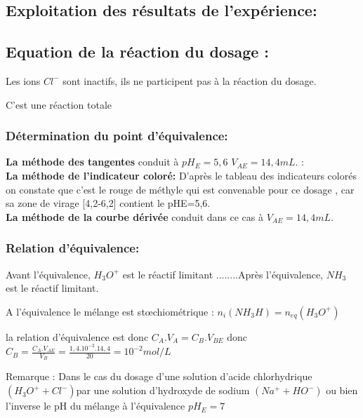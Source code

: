 \documentclass[12pt]{article}
\begin{document}
\subsection{Exploitation des résultats de l'expérience:}
\subsection{Equation de la réaction du dosage :}
Les ions $Cl^-$ sont inactifs, ils ne participent pas à la réaction du dosage. 


C'est une réaction totale


\subsubsection{Détermination du point d'équivalence:}
\textbf{La méthode des tangentes  }conduit à $pH_E = 5,6$ $V_{AE}=14,4mL$.
:
\\\textbf{La méthode de l'indicateur coloré:} D'après le tableau des indicateurs colorés on constate que c'est le rouge de méthyle
qui est convenable pour ce dosage , car sa zone de virage [4,2-6,2] contient le pHE=5,6.
\\\textbf{La méthode de la courbe dérivée }conduit dans ce cas à $V_{AE}=14,4mL$.


\subsubsection{Relation d'équivalence: }

Avant l'équivalence, $H_3O^+$ est le réactif limitant ........Après l'équivalence, $NH_3$ est le réactif limitant.

A l'équivalence le mélange est stœchiométrique : $n_i(NH_3H) = n_{eq}(H_3O^+)$

la relation d’équivalence est donc $C_A.V_A  = C_B.V_{BE}$
donc $C_B = \frac{C_A.V_{AE}}{V_B} = \frac{1,4.10^{-2}.14,4}{20} = 10^{-2} mol/L$

\begin{tcolorbox}
Remarque : Dans le cas du dosage d'une solution d'acide chlorhydrique $(H_3O^+ + Cl^-) $par une solution d'hydroxyde de sodium $(Na^+ + HO^-)$ ou bien l'inverse le pH du mélange à l'équivalence $pH_E = 7$
\end{tcolorbox}


\end{document}
